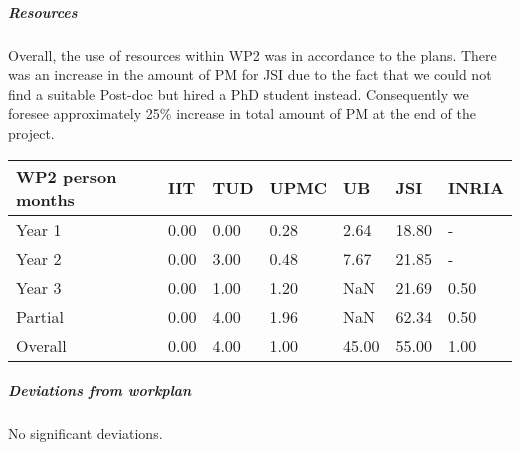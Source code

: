 
\subparagraph{Resources}
Overall, the use of resources within WP2 was in accordance to the plans. There was an increase in the amount of PM for JSI due to the fact that we could not find a suitable Post-doc but hired a PhD student instead. Consequently we foresee approximately 25\% increase in total amount of PM at the end of the project.

\begin{center}
\begin{tabular}{|C{1.5cm}|C{1.5cm}|C{1.5cm}|C{2cm}|C{2cm}|C{2cm}|C{2cm}|}
\hline
\footnotesize \textbf{WP2 person months}& \footnotesize \textbf{IIT}&\footnotesize \textbf{TUD}&\footnotesize \textbf{UPMC}& \footnotesize \textbf{UB} &\footnotesize \textbf{JSI} & \footnotesize \textbf{INRIA} \\ \hline
\footnotesize Year 1 &  0.00     & 0.00 & 0.28 & 2.64 & 18.80  &-  \\  \hline
\footnotesize Year 2 &  0.00     & 3.00 & 0.48 & 7.67 & 21.85  &-  \\  \hline
\footnotesize Year 3 &  0.00     & 1.00 & 1.20 & NaN & 21.69  & 0.50  \\  \hline
\footnotesize Partial &  0.00     & 4.00 & 1.96 & NaN & 62.34 & 0.50 \\ \hline \hline
\footnotesize Overall & 0.00     & 4.00 & 1.00 & 45.00 & 55.00 & 1.00 \\ \hline
\end{tabular}
\end{center}

\subparagraph{Deviations from workplan} 
No significant deviations.